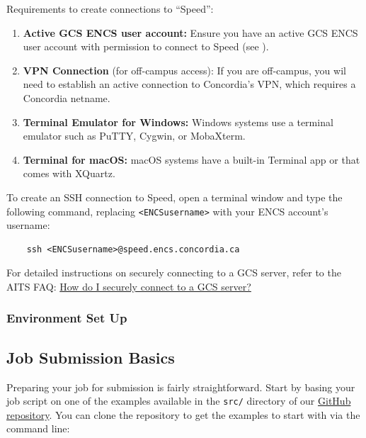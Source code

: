 \documentclass{easychair}
\begin{document}
Requirements to create connections to ``Speed'':
\begin{enumerate}
	\item \textbf{Active GCS ENCS user account:} Ensure you have an active GCS ENCS user account with 
	permission to connect to Speed (see ).
	\item \textbf{VPN Connection} (for off-campus access): If you are off-campus, you wil need to establish an active connection to Concordia's VPN, 
	which requires a Concordia netname.
	\item \textbf{Terminal Emulator for Windows:} Windows systems use a terminal emulator such as PuTTY, Cygwin, or MobaXterm.
	\item \textbf{Terminal for macOS:} macOS systems have a built-in Terminal app or  that comes with XQuartz.
\end{enumerate}

\noindent To create an SSH connection to Speed, open a terminal window and type the following command, replacing \verb!<ENCSusername>! with your ENCS account's username:
\begin{verbatim}
    ssh <ENCSusername>@speed.encs.concordia.ca
\end{verbatim}

\noindent For detailed instructions on securely connecting to a GCS server, refer to the AITS FAQ: 
\href{https://www.concordia.ca/ginacody/aits/support/faq/ssh-to-gcs.html}{How do I securely connect to a GCS server?}

\subsubsection{Environment Set Up}
\label{sect:envsetup}


\subsection{Job Submission Basics}
\label{sect:job-submission-basics}

Preparing your job for submission is fairly straightforward.
Start by basing your job script on one of the examples available in the \texttt{src/}
directory of our \href{https://github.com/NAG-DevOps/speed-hpc}{GitHub repository}.
You can clone the repository to get the examples to start with via the command line:
\end{document}
